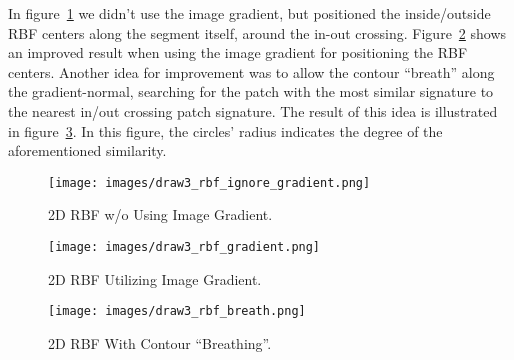 In figure~\ref{fig:rbfNoGrad} we didn't use the image gradient, but positioned the inside/outside RBF centers along the segment itself, around the in-out crossing.
Figure~\ref{fig:rbfGrad} shows an improved result when using the image gradient for positioning the RBF centers.
Another idea for improvement was to allow the contour ``breath'' along the gradient-normal, searching for the patch with the most similar signature to the nearest in/out crossing patch signature.
The result of this idea is illustrated in figure~\ref{fig:rbfBreath}.
In this figure, the circles' radius indicates the degree of the aforementioned similarity.

\begin{figure}[htb]
	\centering
		\texttt{[image: images/draw3\_rbf\_ignore\_gradient.png]}
			\caption[2D RBF w/o Using Image Gradient]{
				2D RBF w/o Using Image Gradient.
		}\label{fig:rbfNoGrad}
\end{figure}

\begin{figure}[htb]
	\centering
		\texttt{[image: images/draw3\_rbf\_gradient.png]}
			\caption[2D RBF Utilizing Image Gradient]{
				2D RBF Utilizing Image Gradient.
		}\label{fig:rbfGrad}
\end{figure}

\begin{figure}[htb]
	\centering
		\texttt{[image: images/draw3\_rbf\_breath.png]}
			\caption[2D RBF With Contour ``Breathing'']{
				2D RBF With Contour ``Breathing''.
		}\label{fig:rbfBreath}
\end{figure}

